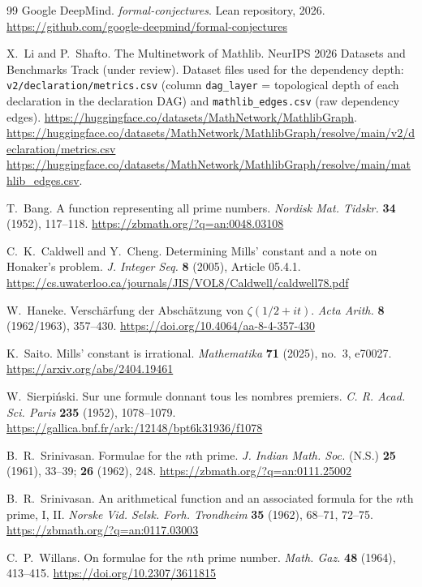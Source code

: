 \documentclass[11pt,reqno]{amsart}
\theoremstyle{blueplain}
\numberwithin{equation}{section}
\begin{document}
\begin{thebibliography}{99}
	 Google DeepMind. \emph{formal-conjectures}. Lean
	repository, 2026.
	\url{https://github.com/google-deepmind/formal-conjectures}
	
	 X.~Li and P.~Shafto. The Multinetwork of
	Mathlib. NeurIPS 2026 Datasets and Benchmarks Track (under review).
	Dataset files used for the dependency depth: \texttt{v2/declaration/metrics.csv}
	(column \texttt{dag\_layer} = topological depth of each declaration in the
	declaration DAG) and \texttt{mathlib\_edges.csv} (raw dependency edges).
	{\scriptsize
		\url{https://huggingface.co/datasets/MathNetwork/MathlibGraph}.\newline
		\url{https://huggingface.co/datasets/MathNetwork/MathlibGraph/resolve/main/v2/declaration/metrics.csv}\newline
		\url{https://huggingface.co/datasets/MathNetwork/MathlibGraph/resolve/main/mathlib_edges.csv}.}
	
	 T.~Bang. A function representing all prime numbers. \emph{Nordisk Mat.
		Tidskr.} \textbf{34} (1952), 117--118.
	\url{https://zbmath.org/?q=an:0048.03108}
	
	 C.~K.~Caldwell and Y.~Cheng. Determining Mills'
	constant and a note on Honaker's problem. \emph{J. Integer Seq.} \textbf{8}
	(2005), Article 05.4.1.
	\url{https://cs.uwaterloo.ca/journals/JIS/VOL8/Caldwell/caldwell78.pdf}
	
	 W.~Haneke. Versch\"arfung der Absch\"atzung von
	$\zeta(1/2+it)$. \emph{Acta Arith.} \textbf{8} (1962/1963), 357--430.
	\url{https://doi.org/10.4064/aa-8-4-357-430}
	
	 K.~Saito. Mills' constant is irrational. \emph{Mathematika}
	\textbf{71} (2025), no.~3, e70027.
	\url{https://arxiv.org/abs/2404.19461}
	
	 W.~Sierpi\'nski. Sur une formule donnant tous les
	nombres premiers. \emph{C. R. Acad. Sci. Paris} \textbf{235} (1952), 1078--1079.
	\url{https://gallica.bnf.fr/ark:/12148/bpt6k31936/f1078}
	
	 B.~R.~Srinivasan. Formulae for the $n$th prime.
	\emph{J. Indian Math. Soc.} (N.S.) \textbf{25} (1961), 33--39; \textbf{26}
	(1962), 248.
	\url{https://zbmath.org/?q=an:0111.25002}
	
	 B.~R.~Srinivasan. An arithmetical function and an
	associated formula for the $n$th prime, I, II. \emph{Norske Vid. Selsk. Forh.
		Trondheim} \textbf{35} (1962), 68--71, 72--75.
	\url{https://zbmath.org/?q=an:0117.03003}
	
	 C.~P.~Willans. On formulae for the $n$th prime number.
	\emph{Math. Gaz.} \textbf{48} (1964), 413--415.
	\url{https://doi.org/10.2307/3611815}
	
\end{thebibliography}
\end{document}
